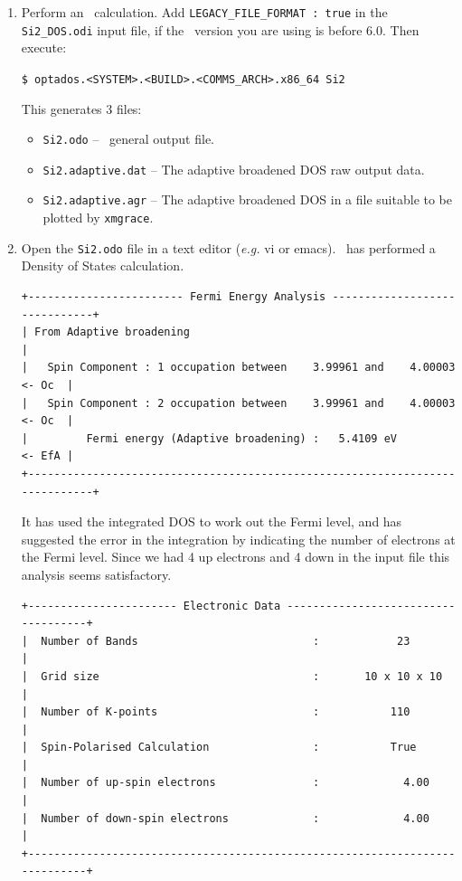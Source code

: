 \documentclass[a4paper,11pt,twoside]{book}
\begin{document}
{\begin{enumerate}
This should take a couple of seconds to run. More help can be found in  the tutorials  on  the \castep\ website \verb#www.castep.org#.

\item Perform an \optados\ calculation.  Add \verb#LEGACY_FILE_FORMAT : true# in the \verb#Si2_DOS.odi# input file, if the \castep\ version you are using is before 6.0. Then execute:

\verb#$ optados.<SYSTEM>.<BUILD>.<COMMS_ARCH>.x86_64 Si2#

This generates 3 files:
\begin{itemize}
\item \verb#Si2.odo# -- \optados\ general output file.
\item \verb#Si2.adaptive.dat# -- The adaptive broadened DOS raw output data.
\item  \verb#Si2.adaptive.agr# -- The adaptive broadened DOS in a file suitable to be plotted by  \verb#xmgrace#.
\end{itemize}

\item Open the \verb#Si2.odo# file in a text editor (\emph{e.g.} vi or emacs).  \optados\ has performed a Density of States calculation.

\begin{verbatim}
+------------------------ Fermi Energy Analysis ------------------------------+
| From Adaptive broadening                                                    |
|   Spin Component : 1 occupation between    3.99961 and    4.00003    <- Oc  |
|   Spin Component : 2 occupation between    3.99961 and    4.00003    <- Oc  |
|         Fermi energy (Adaptive broadening) :   5.4109 eV             <- EfA |
+-----------------------------------------------------------------------------+
\end{verbatim}
It has used the integrated DOS to work out the Fermi level, and has suggested the error in the integration by indicating the number of electrons at the Fermi level. Since we had 4 up electrons and 4 down in the input file this analysis seems satisfactory.
\begin{verbatim}
+----------------------- Electronic Data ------------------------------------+
|  Number of Bands                           :            23                 |
|  Grid size                                 :       10 x 10 x 10            |
|  Number of K-points                        :           110                 |
|  Spin-Polarised Calculation                :           True                |
|  Number of up-spin electrons               :             4.00              |
|  Number of down-spin electrons             :             4.00              |
+----------------------------------------------------------------------------+
\end{verbatim}


\end{enumerate}}
\end{document}
